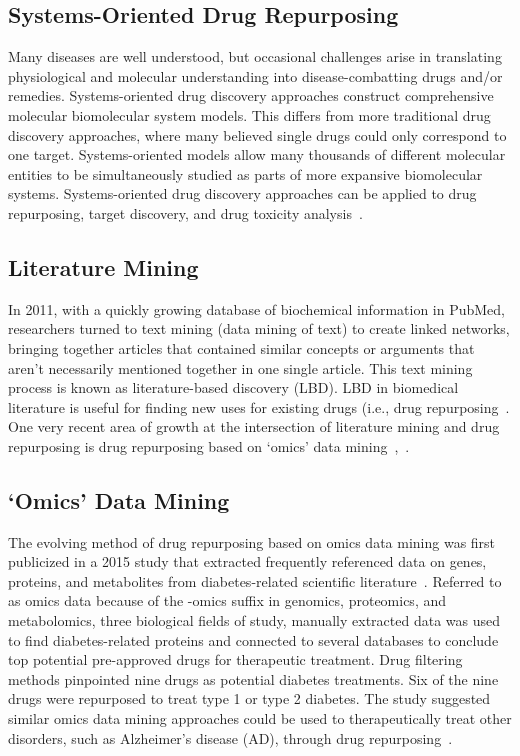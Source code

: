 \documentclass{IEEEtran}
\begin{document}
		\subsection{Systems-Oriented Drug Repurposing}
		Many diseases are well understood, but occasional challenges arise in translating physiological and molecular understanding into disease-combatting drugs and/or remedies.  Systems-oriented drug discovery approaches construct comprehensive molecular biomolecular system models.  This differs from more traditional drug discovery approaches, where many believed single drugs could only correspond to one target.  Systems-oriented models allow many thousands of different molecular entities to be simultaneously studied as parts of more expansive biomolecular systems.  Systems-oriented drug discovery approaches can be applied to drug repurposing, target discovery, and drug toxicity analysis~\cite{dud}.
		
		\subsection{Literature Mining}
		
		In 2011, with a quickly growing database of biochemical information in PubMed, researchers turned to text mining (data mining of text) to create linked networks, bringing together articles that contained similar concepts or arguments that aren't necessarily mentioned together in one single article.  This text mining process is known as literature-based discovery (LBD).  LBD in biomedical literature is useful for finding new uses for existing drugs (i.e., drug repurposing~\cite{andronis}.  One very recent area of growth at the intersection of literature mining and drug repurposing is drug repurposing based on `omics' data mining~\cite{zhang15},~\cite{zhang16}.  
	
	\subsection{`Omics' Data Mining} \label{omics}
	The evolving method of drug repurposing based on omics data mining was first publicized in a 2015 study that extracted frequently referenced data on genes, proteins, and metabolites from diabetes-related scientific literature~\cite{zhang15}.  Referred to as omics data because of the -omics suffix in genomics, proteomics, and metabolomics, three biological fields of study, manually extracted data was used to find diabetes-related proteins and connected to several databases to conclude top potential pre-approved drugs for therapeutic treatment.  Drug filtering methods pinpointed nine drugs as potential diabetes treatments.  Six of the nine drugs were repurposed to treat type 1 or type 2 diabetes.  The study suggested similar omics data mining approaches could be used to therapeutically treat other disorders, such as Alzheimer's disease (AD), through drug repurposing~\cite{zhang15}.  
	
\end{document}
